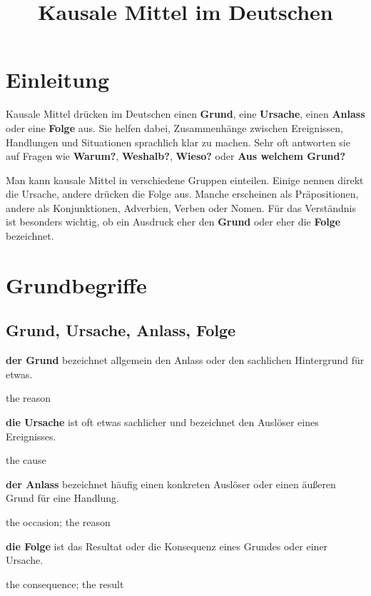 \documentclass[a4paper]{article}
\title{Kausale Mittel im Deutschen}
\date{}
\newcommand{\EN}[1]{\par{\small\textcolor{TranslationGray}{#1}}\vspace{0.25em}}
\begin{document}
    \maketitle
    
    
    \section{Einleitung}
        Kausale Mittel drücken im Deutschen einen \textbf{Grund}, eine \textbf{Ursache}, einen \textbf{Anlass} oder eine \textbf{Folge} aus. Sie helfen dabei, Zusammenhänge zwischen Ereignissen, Handlungen und Situationen sprachlich klar zu machen. Sehr oft antworten sie auf Fragen wie \textbf{Warum?}, \textbf{Weshalb?}, \textbf{Wieso?} oder \textbf{Aus welchem Grund?}
        
        Man kann kausale Mittel in verschiedene Gruppen einteilen. Einige nennen direkt die Ursache, andere drücken die Folge aus. Manche erscheinen als Präpositionen, andere als Konjunktionen, Adverbien, Verben oder Nomen. Für das Verständnis ist besonders wichtig, ob ein Ausdruck eher den \textbf{Grund} oder eher die \textbf{Folge} bezeichnet.
    
    
    \section{Grundbegriffe}
        
        \subsection{Grund, Ursache, Anlass, Folge}
            \textbf{der Grund} bezeichnet allgemein den Anlass oder den sachlichen Hintergrund für etwas.\\
            \EN{the reason}
            
            \textbf{die Ursache} ist oft etwas sachlicher und bezeichnet den Auslöser eines Ereignisses.\\
            \EN{the cause}
            
            \textbf{der Anlass} bezeichnet häufig einen konkreten Auslöser oder einen äußeren Grund für eine Handlung.\\
            \EN{the occasion; the reason}
            
            \textbf{die Folge} ist das Resultat oder die Konsequenz eines Grundes oder einer Ursache.\\
            \EN{the consequence; the result}
        
\end{document}
